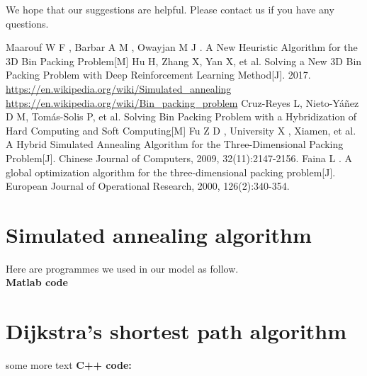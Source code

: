 \documentclass{mcmthesis}
\begin{document}
\noindent We hope that our suggestions are helpful. Please contact us if you have any questions.
\newpage 

\begin{thebibliography}{99}
	 Maarouf W F , Barbar A M , Owayjan M J . A New Heuristic Algorithm for the 3D Bin Packing Problem[M]
	Hu H, Zhang X, Yan X, et al. Solving a New 3D Bin Packing Problem with Deep Reinforcement Learning Method[J]. 2017.
	\url{https://en.wikipedia.org/wiki/Simulated_annealing}
	\url{https://en.wikipedia.org/wiki/Bin_packing_problem}
	Cruz-Reyes L, Nieto-Yáñez D M, Tomás-Solis P, et al. Solving Bin Packing Problem with a Hybridization of Hard Computing and Soft Computing[M]
	Fu Z D , University X , Xiamen, et al. A Hybrid Simulated Annealing Algorithm for the Three-Dimensional Packing Problem[J]. Chinese Journal of Computers, 2009, 32(11):2147-2156.
	Faina L . A global optimization algorithm for the three-dimensional packing problem[J]. European Journal of Operational Research, 2000, 126(2):340-354.
\end{thebibliography}

\begin{appendices}

\section{Simulated annealing algorithm}


Here are programmes we used in our model as follow.\\

\textbf{\textcolor[rgb]{0.98,0.00,0.00}{Matlab code}}






\section{Dijkstra's shortest path algorithm}

some more text \textcolor[rgb]{0.98,0.00,0.00}{\textbf{C++ code:}}


\end{appendices}
\end{document}
